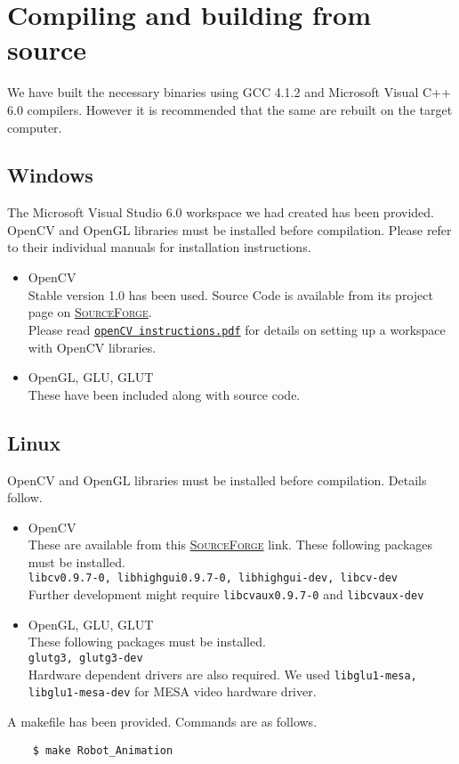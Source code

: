 \documentclass[10pt,a4paper]{article}
\begin{document}
\section{Compiling and building from source}
We have built the necessary binaries using GCC 4.1.2 and Microsoft Visual C++ 6.0 compilers. However it is recommended that the same are rebuilt on the target computer.
\subsection{Windows}
The Microsoft Visual Studio 6.0 workspace we had created has been provided. OpenCV and OpenGL libraries must be installed before compilation. Please refer to their individual manuals for installation instructions.
\begin{itemize}
\item OpenCV \\
Stable version 1.0 has been used. Source Code is available from its project page on \href{http://sourceforge.net/projects/opencvlibrary/}{\textsc{SourceForge}\textsuperscript{\textregistered}}. \\
Please read \href{openCV instructions.pdf}{\texttt{openCV instructions.pdf}} for details on setting up a workspace with OpenCV libraries.
\item OpenGL, GLU, GLUT \\
These have been included along with source code.
\end{itemize}
\subsection{Linux}
OpenCV and OpenGL libraries must be installed before compilation. Details follow.
\begin{itemize}
\item OpenCV \\
These are available from this \href{http://sourceforge.net/projects/opencvlibrary/}{\textsc{SourceForge}\textsuperscript{\textregistered}} link. These following packages must be installed. \\
\texttt{libcv0.9.7-0, libhighgui0.9.7-0, libhighgui-dev, libcv-dev} \\
Further development might require \texttt{libcvaux0.9.7-0} and \texttt{libcvaux-dev}
\item OpenGL, GLU, GLUT \\
These following packages must be installed. \\
\texttt{glutg3, glutg3-dev} \\
Hardware dependent drivers are also required. We used \texttt{libglu1-mesa, libglu1-mesa-dev} for MESA video hardware driver.
\end{itemize}
A makefile has been provided. Commands are as follows.
\begin{commandline}
\begin{verbatim}
	$ make Robot_Animation
\end{verbatim}
\end{commandline}
\end{document}
